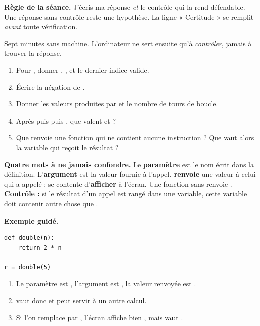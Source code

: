 \documentclass[10pt,a4paper]{article}
\begin{document}
\begin{graybox}\small\textbf{Règle de la séance.} J'écris ma réponse \emph{et} le contrôle qui la rend défendable. Une réponse sans contrôle reste une hypothèse. La ligne « Certitude » se remplit \emph{avant} toute vérification.\end{graybox}
\par\vspace{2mm}
Sept minutes sans machine. L'ordinateur ne sert ensuite qu'à \emph{contrôler}, jamais à trouver la réponse.
\begin{enumerate}
\item Pour , donner , ,  et le dernier indice valide.
\item Écrire la négation de .
\item Donner les valeurs produites par  et le nombre de tours de boucle.
\item Après  puis  puis , que valent  et  ?
\item Que renvoie une fonction qui ne contient aucune instruction  ? Que vaut alors la variable qui reçoit le résultat ?
\end{enumerate}
\certline
\aideline
\needspace{62mm}\par\vspace{3mm}
\begin{methodbox}
\textbf{Quatre mots à ne jamais confondre.}
Le \textbf{paramètre} est le nom écrit dans la définition. L'\textbf{argument} est la valeur fournie à l'appel.
 \textbf{renvoie} une valeur à celui qui a appelé ;  se contente d'\textbf{afficher}
à l'écran. Une fonction sans  renvoie .
\textbf{Contrôle :} si le résultat d'un appel est rangé dans une variable, cette variable doit contenir autre chose que .
\end{methodbox}
\begin{graybox}
\textbf{Exemple guidé.}
\begin{lstlisting}
def double(n):
    return 2 * n

r = double(5)
\end{lstlisting}
\begin{enumerate}
\item Le paramètre est , l'argument est , la valeur renvoyée est .
\item {} vaut donc  et peut servir à un autre calcul.
\item Si l'on remplace  par , l'écran affiche bien , mais  vaut .
\end{enumerate}
\end{graybox}
\end{document}
